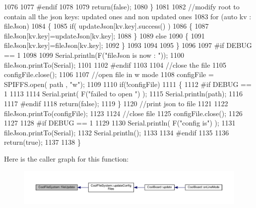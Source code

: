 \begin{DoxyCode}
1076 
1077 \textcolor{preprocessor}{    #endif}
1078 
1079         \textcolor{keywordflow}{return}(\textcolor{keyword}{false});
1080     \}
1081     
1082     \textcolor{comment}{//modify root to contain all the json keys: updated ones and non updated ones}
1083     \textcolor{keywordflow}{for} (\textcolor{keyword}{auto} kv : fileJson) 
1084     \{
1085         \textcolor{keywordflow}{if}( updateJson[kv.key].success() )
1086         \{
1087             fileJson[kv.key]=updateJson[kv.key];            
1088         \}
1089         \textcolor{keywordflow}{else}
1090         \{
1091             fileJson[kv.key]=fileJson[kv.key];
1092         \}
1093 
1094                 
1095     \}
1096 
1097 \textcolor{preprocessor}{#if DEBUG == 1}
1098 
1099     Serial.println(F(\textcolor{stringliteral}{"fileJson is now : "}));
1100     fileJson.printTo(Serial);
1101 
1102 \textcolor{preprocessor}{#endif}
1103 
1104     \textcolor{comment}{//close the file}
1105     configFile.close();
1106 
1107     \textcolor{comment}{//open file in w mode}
1108     configFile = SPIFFS.open( path , \textcolor{stringliteral}{"w"});
1109     
1110     \textcolor{keywordflow}{if}(!configFile)
1111     \{   
1112 \textcolor{preprocessor}{    #if DEBUG == 1}
1113         
1114         Serial.print( F(\textcolor{stringliteral}{"failed to open "}) );
1115         Serial.println(path);
1116 
1117 \textcolor{preprocessor}{    #endif}
1118         \textcolor{keywordflow}{return}(\textcolor{keyword}{false});
1119     \}
1120     \textcolor{comment}{//print json to file    }
1121     
1122     fileJson.printTo(configFile);
1123     
1124     \textcolor{comment}{//close file}
1125     configFile.close();
1126 
1127 
1128 \textcolor{preprocessor}{#if DEBUG == 1}
1129 
1130     Serial.println( F(\textcolor{stringliteral}{"config is"}) );
1131     fileJson.printTo(Serial);
1132     Serial.println();
1133 
1134 \textcolor{preprocessor}{#endif}
1135     
1136     \textcolor{keywordflow}{return}(\textcolor{keyword}{true});
1137     
1138 \}
\end{DoxyCode}
Here is the caller graph for this function\+:\nopagebreak
\begin{figure}[H]
\begin{center}
\leavevmode
\includegraphics[width=350pt]{db/d0c/class_cool_file_system_a13f2958f5b87757c31fc53797a30d23a_icgraph}
\end{center}
\end{figure}
\mbox{\label{class_cool_file_system_a70701d05e811604af1b531f4f6dc69ed}} 
